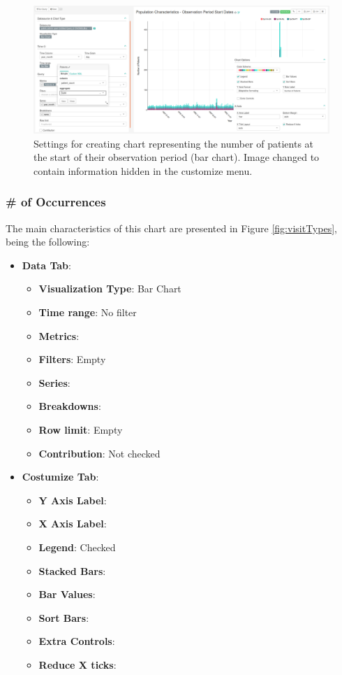 \documentclass[]{book}
\providecommand{\tightlist}{%
  \setlength{\itemsep}{0pt}\setlength{\parskip}{0pt}}
\begin{document}
\begin{figure}
\includegraphics[width=1\linewidth]{images/populationCharacteristicsObservationPeriodStartDates} \caption{Settings for creating chart representing the number of patients at the start of their observation period (bar chart). Image changed to contain information hidden in the customize menu.}\label{fig:visitTypes3}
\end{figure}

\subsubsection{\# of Occurrences}\label{of-occurrences}

The main characteristics of this chart are presented in Figure
\ref{fig:visitTypes}, being the following:

\begin{itemize}
\tightlist
\item
  \textbf{Data Tab}:

  \begin{itemize}
  \tightlist
  \item
    \textbf{Visualization Type}: Bar Chart
  \item
    \textbf{Time range}: No filter
  \item
    \textbf{Metrics}:
  \item
    \textbf{Filters}: Empty
  \item
    \textbf{Series}:
  \item
    \textbf{Breakdowns}:
  \item
    \textbf{Row limit}: Empty
  \item
    \textbf{Contribution}: Not checked
  \end{itemize}
\item
  \textbf{Costumize Tab}:

  \begin{itemize}
  \tightlist
  \item
    \textbf{Y Axis Label}:
  \item
    \textbf{X Axis Label}:
  \item
    \textbf{Legend}: Checked
  \item
    \textbf{Stacked Bars}:
  \item
    \textbf{Bar Values}:
  \item
    \textbf{Sort Bars}:
  \item
    \textbf{Extra Controls}:
  \item
    \textbf{Reduce X ticks}:
  \end{itemize}
\end{itemize}
\end{document}
